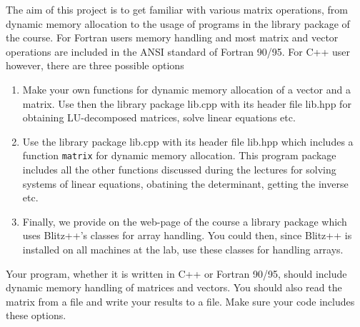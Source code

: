 \documentclass[11pt,a4wide]{article}
\begin{document}
The aim of this project is to get familiar with various matrix operations,
from dynamic memory allocation to the usage of programs in the library
package of the course. 
For Fortran users memory handling and most matrix and vector operations
are included in the ANSI standard of Fortran 90/95. For C++ user however,
there are three possible options
\begin{enumerate}
\item Make your own functions for dynamic memory allocation of a 
vector and a matrix. Use then the 
library package lib.cpp with its header file 
lib.hpp for obtaining LU-decomposed matrices, solve linear equations
etc.
\item Use the library package lib.cpp with its header file 
lib.hpp which includes a function \verb?matrix? for dynamic memory
allocation. This program package includes all the other functions
discussed during the lectures for solving systems of linear equations,
obatining the determinant, getting the inverse etc.
\item Finally, we provide on the web-page of the course a library package
which uses Blitz++'s classes for array handling. You could then, since
Blitz++ is installed on all machines at the lab, use these classes for handling
arrays.
\end{enumerate}

Your program, whether it is written in C++ or Fortran 90/95, should include
dynamic memory handling of matrices and vectors. You should also read the matrix from a file
and write your results to a file. Make sure your code includes these options.
\end{document}
